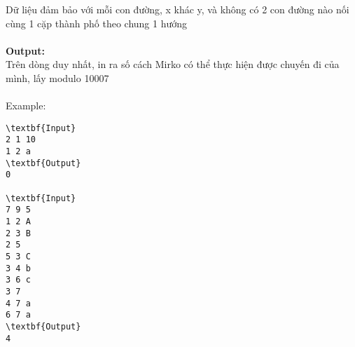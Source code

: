 Dữ liệu đảm bảo với mỗi con đường, x khác y, và không có 2 con đường nào nối cùng 1 cặp thành phố theo chung 1 hướng
\\
\\\textbf{Output:}
\\Trên dòng duy nhất, in ra số cách Mirko có thể thực hiện được chuyến đi của mình, lấy modulo 10007
\\
\\Example:
\begin{verbatim}
\textbf{Input}
2 1 10
1 2 a
\textbf{Output}
0

\textbf{Input}
7 9 5
1 2 A
2 3 B
2 5
5 3 C
3 4 b
3 6 c
3 7
4 7 a
6 7 a
\textbf{Output}
4\end{verbatim}